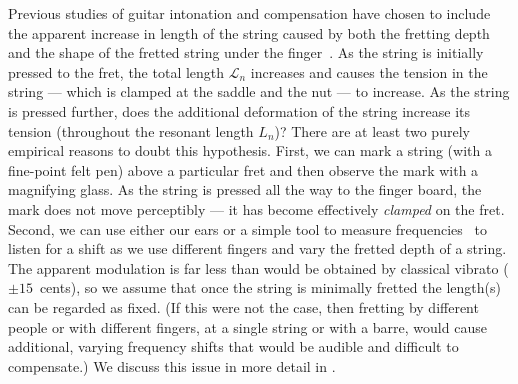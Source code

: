 Previous studies of guitar intonation and compensation have chosen to include the apparent increase in length of the string caused by both the fretting depth and the shape of the fretted string under the finger~\cite{ref:byers1996cgi,ref:varieschi2010icf}. As the string is initially pressed to the fret, the total length $\mathcal{L}_n$ increases and causes the tension in the string --- which is clamped at the saddle and the nut --- to increase. As the string is pressed further, does the additional deformation of the string increase its tension (throughout the resonant length $L_n$)? There are at least two purely empirical reasons to doubt this hypothesis. First, we can mark a string (with a fine-point felt pen) above a particular fret and then observe the mark with a magnifying glass. As the string is pressed all the way to the finger board, the mark does not move perceptibly --- it has become effectively \emph{clamped} on the fret. Second, we can use either our ears or a simple tool to measure frequencies~\cite{ref:pgtweb} to listen for a shift as we use different fingers and vary the fretted depth of a string. The apparent modulation is far less than would be obtained by classical vibrato ($\pm15$~cents), so we assume that once the string is minimally fretted the length(s) can be regarded as fixed. (If this were not the case, then fretting by different people or with different fingers, at a single string or with a barre, would cause additional, varying frequency shifts that would be audible and difficult to compensate.) We discuss this issue in more detail in .

